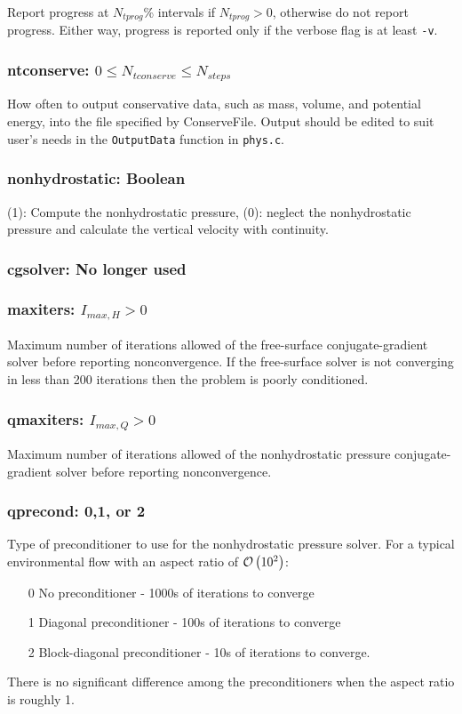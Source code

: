 Report progress at $N_{tprog}$\% intervals if $N_{tprog}>0$, otherwise do not report
progress.  Either way, progress is reported only if the verbose flag is at least \verb+-v+.

\subsubsection{ntconserve: $0\le N_{tconserve}\le N_{steps}$}

How often to output conservative data, such as mass, volume, and potential energy, into
the file specified by ConserveFile.  Output should be edited to suit user's needs in
the \verb+OutputData+ function in \verb+phys.c+.

\subsubsection{nonhydrostatic: Boolean}

(1): Compute the nonhydrostatic pressure, (0): neglect the nonhydrostatic pressure and
calculate the vertical velocity with continuity.

\subsubsection{cgsolver: No longer used}

\subsubsection{maxiters: $I_{max,H}>0$}

Maximum number of iterations allowed of the free-surface conjugate-gradient solver before
reporting nonconvergence.  If the free-surface solver is not converging in less than 200
iterations then the problem is poorly conditioned.

\subsubsection{qmaxiters: $I_{max,Q}>0$}

Maximum number of iterations allowed of the nonhydrostatic pressure conjugate-gradient solver before
reporting nonconvergence. 

\subsubsection{qprecond: 0,1, or 2}

Type of preconditioner to use for the nonhydrostatic pressure solver.  For a typical environmental
flow with an aspect ratio of $\mathcal{O}\left(10^2\right)$:
\begin{enumerate}
\item[0] No preconditioner - 1000s of iterations to converge
\item[1] Diagonal preconditioner - 100s of iterations to converge
\item[2] Block-diagonal preconditioner - 10s of iterations to converge.
\end{enumerate}
There is no significant difference among the preconditioners when the aspect ratio is roughly 1.


